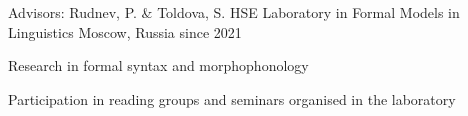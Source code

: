 

\begin{cventries}

  \cventry
    {Advisors: Rudnev, P. \& Toldova, S.} %
    {HSE Laboratory in Formal Models in Linguistics} %
    {Moscow, Russia} %
    {since 2021} %
    {
      \begin{cvitems} %
        \item {Research in formal syntax and morphophonology}
        \item {Participation in reading groups and seminars organised in the laboratory}
      \end{cvitems}
    }

    
\end{cventries}

    


